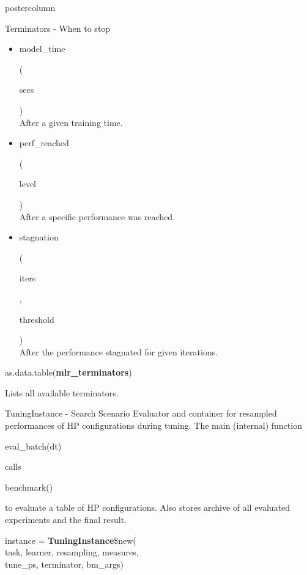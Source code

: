 \documentclass{beamer}
\newcommand{\codeinline}[1]{\begin{codeboxinline}#1\end{codeboxinline}}
\begin{document}
\begin{frame}[fragile]{}
\begin{columns}
\begin{column}{.245\textwidth}
\begin{beamercolorbox}[center]{postercolumn}
\begin{minipage}{.98\textwidth}
{\begin{myblock}{Terminators - When to stop}
\begin{itemize}
								      After a given absolute time.
								\item \codeinline{model\_time}
								      (\codeinline{secs })\\
								      After a given training time.
								\item \codeinline{perf\_reached}
								      (\codeinline{level})\\
								      After a specific performance was reached.
								\item \codeinline{stagnation}
								      (\codeinline{iters}, \codeinline{threshold})\\
								      After the performance stagnated for given iterations.
							\end{itemize}
							\vspace{1em}
							\begin{codebox}
								as.data.table(\textbf{mlr\_terminators})
							\end{codebox}
							Lists all available terminators.
						\end{myblock}
						\begin{myblock}{TuningInstance - Search Scenario}
							Evaluator and container for resampled performances of HP configurations during tuning.
							The main (internal) function \codeinline{eval\_batch(dt)} calls \codeinline{benchmark()} to evaluate a table of HP configurations.
							Also stores archive of all evaluated experiments and the final result.
							\\
							\begin{codeboxmultiline}[width=23.7cm]
								instance = \textbf{TuningInstance}\$new(\\
								\hspace*{1ex}task, learner, resampling, measures,\\
								\hspace*{1ex}tune\_ps, terminator, bm\_args)
							\end{codeboxmultiline}
							\vspace{1em}
							\begin{codeboxexample}

\end{codeboxexample}
\end{myblock}}
\end{minipage}
\end{beamercolorbox}
\end{column}
\end{columns}
\end{frame}
\end{document}
